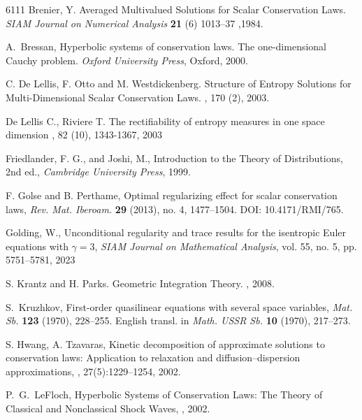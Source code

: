 \documentclass[11pt, twoside, reqno]{amsart}
\theoremstyle{definition}
\theoremstyle{remark}
\numberwithin{equation}{section}
\begin{document}
\begin{thebibliography}{6111}
 Brenier, Y. Averaged Multivalued Solutions for Scalar Conservation Laws. \emph{SIAM Journal on Numerical Analysis} {\bf 21} (6) 1013–37 ,1984.


 A.~Bressan, Hyperbolic systems of conservation
    laws.  The one-dimensional Cauchy problem. \textit{Oxford University
  Press}, Oxford, 2000.





C. De Lellis, F.  Otto and M. Westdickenberg.
\newblock Structure of Entropy Solutions for Multi-Dimensional Scalar Conservation Laws.
, 170 (2), 2003.


De Lellis C., Riviere T.
\newblock The rectifiability of entropy measures in one space dimension
, 82 (10), 1343-1367, 2003

Friedlander, F. G., and Joshi, M.,  
Introduction to the Theory of Distributions, 2nd ed., {\em Cambridge University Press}, 1999.



F. Golse and B. Perthame,
Optimal regularizing effect for scalar conservation laws,
\textit{Rev. Mat. Iberoam.} \textbf{29} (2013), no. 4, 1477–1504.
DOI: 10.4171/RMI/765.


Golding, W., 
Unconditional regularity and trace results for the isentropic Euler equations with \(\gamma = 3\), 
\textit{SIAM Journal on Mathematical Analysis}, vol. 55, no. 5, pp. 5751--5781, 2023




S. Krantz and H. Parks.
\newblock  Geometric Integration Theory.
, 2008.


 S.~Kruzhkov, First-order quasilinear equations with
  several space variables, {\it Mat. Sb.} {\bf 123} (1970),
  228--255. English transl. in {\it Math. USSR Sb.} {\bf 10} (1970),
  217--273.


S. Hwang, A. Tzavaras,
\newblock Kinetic decomposition of approximate solutions to conservation laws: Application to relaxation and diffusion–dispersion approximations,
, 27(5):1229--1254, 2002.


P.~G.~LeFloch,
\newblock  Hyperbolic Systems of Conservation Laws: The Theory of Classical and Nonclassical Shock Waves,
, 2002.



\end{thebibliography}
\end{document}
